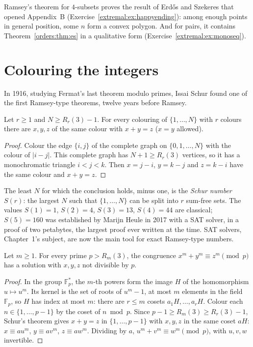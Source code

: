 Ramsey's theorem for $4$-subsets proves the result of Erd\H os and Szekeres that opened Appendix~B (Exercise~\ref{extremal:ex:happyending}): among enough points in general
position, some $n$ form a convex polygon. And for pairs, it contains Theorem~\ref{orders:thm:es} in a qualitative form (Exercise~\ref{extremal:ex:monoseq}).

\section{Colouring the integers}

In 1916, studying Fermat's last theorem modulo primes, Issai Schur found one of the first Ramsey-type theorems, twelve years before Ramsey.

\begin{theorem}[Schur, 1916]\label{extremal:thm:schur}
Let $r\ge1$ and $N\ge R_r(3)-1$. For every colouring of $\{1,\dots,N\}$ with $r$ colours there are $x,y,z$ of the same colour with $x+y=z$ ($x=y$ allowed).
\end{theorem}
\begin{proof}
Colour the edge $\{i,j\}$ of the complete graph on $\{0,1,\dots,N\}$ with the colour of $|i-j|$. This complete graph has $N+1\ge R_r(3)$ vertices, so it has a monochromatic
triangle $i<j<k$. Then $x=j-i$, $y=k-j$ and $z=k-i$ have the same colour and $x+y=z$.
\end{proof}

The least $N$ for which the conclusion holds, minus one, is the \emph{Schur number} $S(r)$: the largest $N$ such that $\{1,\dots,N\}$ can be split into $r$ sum-free
sets. The values $S(1)=1$, $S(2)=4$, $S(3)=13$, $S(4)=44$ are classical; $S(5)=160$ was established by Marijn Heule in 2017 with a SAT solver, in a proof of two petabytes,
the largest proof ever written at the time. SAT solvers, Chapter~1's subject, are now the main tool for exact Ramsey-type numbers.

\begin{corollary}\label{extremal:cor:schurfermat}
Let $m\ge1$. For every prime $p>R_m(3)$, the congruence $x^m+y^m\equiv z^m\pmod p$ has a solution with $x,y,z$ not divisible by $p$.
\end{corollary}
\begin{proof}
In the group $\mathbb F_p^*$, the $m$-th powers form the image $H$ of the homomorphism $u\mapsto u^m$. Its kernel is the set of roots of $u^m-1$, at most $m$ elements in the field
$\mathbb F_p$, so $H$ has index at most $m$: there are $r\le m$ cosets $a_1H,\dots,a_rH$. Colour each $n\in\{1,\dots,p-1\}$ by the coset of $n\bmod p$. Since
$p-1\ge R_m(3)\ge R_r(3)-1$, Schur's theorem gives $x+y=z$ in $\{1,\dots,p-1\}$ with $x,y,z$ in the same coset $aH$: $x\equiv au^m$, $y\equiv av^m$, $z\equiv aw^m$. Dividing by $a$,
$u^m+v^m\equiv w^m\pmod p$, with $u,v,w$ invertible.
\end{proof}

